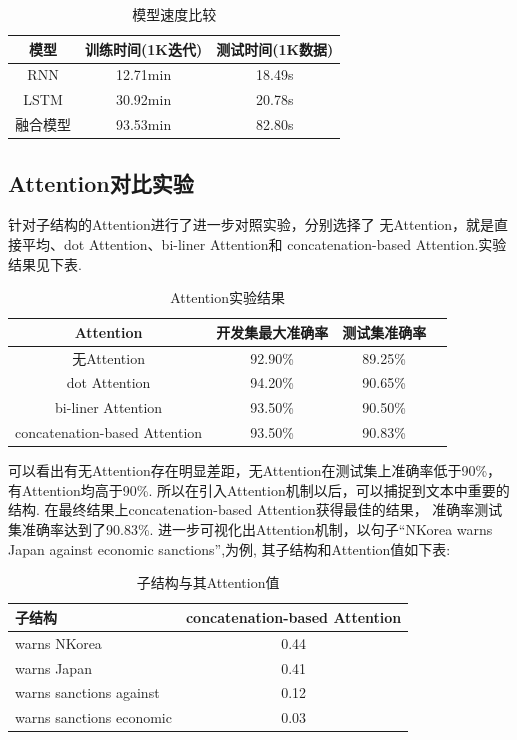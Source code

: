 \documentclass[bachelor,adobefonts]{jnuthesis}
\begin{document}
\begin{table}[h!]
  \centering
  \begin{tabular}{ccc}
    \toprule
    \textbf{模型} & \textbf{训练时间(1K迭代)} & \textbf{测试时间(1K数据)}\\
    \midrule
    RNN &  12.71min & 18.49s \\ 
    LSTM & 30.92min & 20.78s \\ 
    融合模型 & 93.53min & 82.80s \\ 
    \bottomrule
  \end{tabular}
  \caption{模型速度比较}
\end{table}


\subsection{Attention对比实验}
针对子结构的Attention进行了进一步对照实验，分别选择了
无Attention，就是直接平均、dot Attention、bi-liner Attention和
concatenation-based Attention.实验结果见下表.

\begin{table}[h!]
  \centering
  \begin{tabular}{cccc}
    \toprule
    \textbf{Attention} & \textbf{开发集最大准确率} & \textbf{测试集准确率} \\
    \midrule
    无Attention & 92.90\% & 89.25\% \\
    dot Attention & 94.20\% & 90.65\% \\ 
    bi-liner Attention & 93.50\% & 90.50\% \\
    concatenation-based Attention & 93.50\% & 90.83\% \\
    \bottomrule
  \end{tabular}
  \caption{Attention实验结果}
\end{table}

可以看出有无Attention存在明显差距，无Attention在测试集上准确率低于90\%，
有Attention均高于90\%.
所以在引入Attention机制以后，可以捕捉到文本中重要的结构.
在最终结果上concatenation-based Attention获得最佳的结果，
准确率测试集准确率达到了90.83\%.
进一步可视化出Attention机制，以句子“NKorea warns Japan against economic sanctions”,为例,
其子结构和Attention值如下表:

\begin{table}[h!]
  \centering
  \begin{tabular}{lc}
    \toprule
    \textbf{子结构} & \textbf{concatenation-based Attention} \\
    \midrule
    warns NKorea & 0.44 \\ 
    warns Japan & 0.41 \\
    warns sanctions against & 0.12 \\
    warns sanctions economic & 0.03 \\
    \bottomrule
  \end{tabular}
  \caption{子结构与其Attention值}
\end{table}
\end{document}
